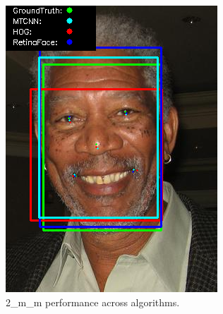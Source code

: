 \documentclass{l4proj}
\begin{document}
\begin{appendices}
\begin{figure}[h!]
  \centering
  \begin{minipage}{0.49\textwidth}
    \centering
     \includegraphics[width=\textwidth]{images/appendix/2.png}
    \caption{2\_m\_m performance across algorithms.}
    \label{whoopi_result}
  \end{minipage}
    \hfill
    \begin{minipage}{0.49\textwidth}
    \centering

\end{minipage}
\end{figure}
\end{appendices}
\end{document}
